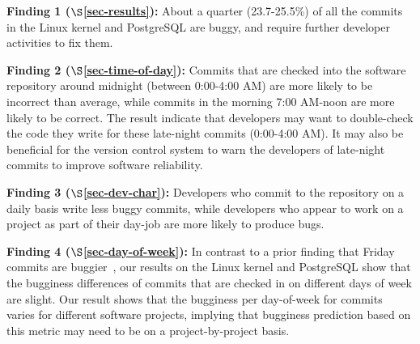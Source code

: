\begin{list}{}{\topsep=0pt\parsep=0pt\leftmargin=9pt\itemindent=0pt}

\item {\bf Finding 1 ($\S$\ref{sec-results}):} 
About a quarter (23.7-25.5\%) of all the commits in the Linux kernel and PostgreSQL are buggy, 
and require further developer activities to fix them.

\item {\bf Finding 2 ($\S$\ref{sec-time-of-day}):} 
Commits that are checked into the software repository around midnight (between 0:00-4:00 AM) 
are more likely to be incorrect than average, while commits in the morning 7:00 AM-noon 
are more likely to be correct.
The result indicate that developers may want to double-check the code they write for these 
late-night commits (0:00-4:00 AM).
It may also be beneficial for the version control
system to warn the developers of late-night commits to improve software reliability. 


\item {\bf Finding 3 ($\S$\ref{sec-dev-char}):} 
Developers who commit to the repository on a daily basis
write less buggy commits, while developers who appear to work on a project
as part of their day-job are more likely to produce
bugs.

\item {\bf Finding 4 ($\S$\ref{sec-day-of-week}):} 
In contrast to a prior finding that Friday commits are buggier~\cite{sliwerski-msr-2005}, 
our results on the Linux kernel and PostgreSQL show that 
the bugginess differences of commits that are checked in on different days of week 
are slight. Our result shows that the bugginess per day-of-week for commits
varies for different software projects, implying that bugginess prediction based on this 
metric may need to be on a project-by-project basis.

\end{list}



